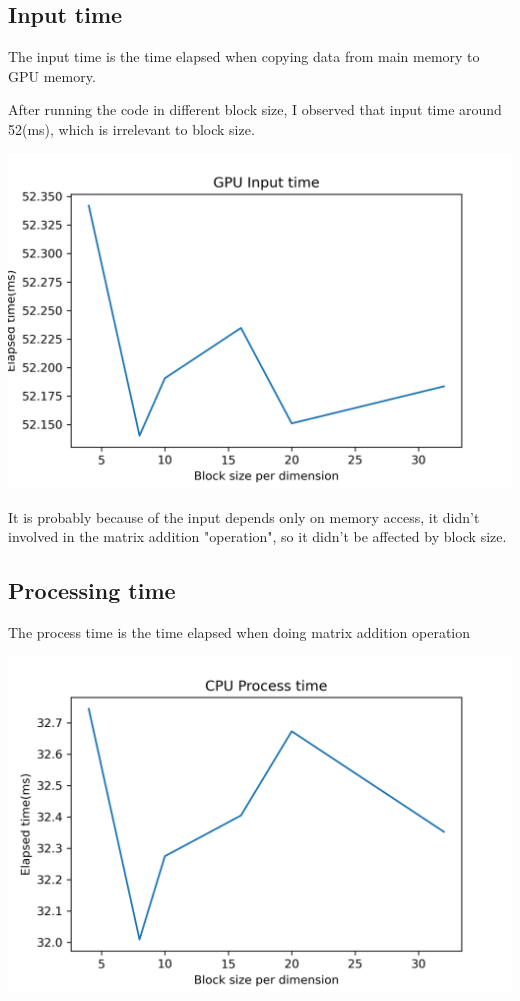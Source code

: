 \documentclass{article}
\begin{document}
	\subsection{Input time}
	The input time is the time elapsed when copying data from main memory to GPU memory.
	
	After running the code in different block size, I observed that input time around 52(ms), which is irrelevant to block size.
	
	\includegraphics[width=\linewidth]{notebook/gpu_input_time}
	
	It is probably because of the input depends only on memory access, it didn't involved in the matrix addition "operation", so it didn't be affected by block size.	
	\subsection{Processing time}
	The process time is the time elapsed when doing matrix addition operation
	
	\includegraphics[width=\linewidth]{notebook/cpu_process_time}
	
\end{document}
